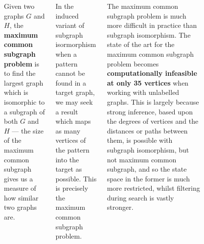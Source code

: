 \documentclass[a0paper]{tikzposter}
\begin{document}
\begin{columns}
{\begin{figure}
\begin{center}
\end{center}
\end{figure}

Given two graphs $G$ and $H$, the \textbf{maximum common subgraph problem} is to find the largest graph which is isomorphic to
a subgraph of both $G$ and $H$ --- the size of the maximum common subgraph gives us a measure of how similar two graphs are.

\bigskip

In the induced variant of subgraph isormorphism when a pattern cannot be found in a target graph, we may seek a result which maps as many vertices of the pattern into the target as possible.  This is precisely the maximum common subgraph problem.

\bigskip

The maximum common subgraph problem is much more difficult in practice than subgraph isomorphism.
The state of the art for the maximum common subgraph
problem becomes \textbf{computationally
infeasible at only 35 vertices} when working with
unlabelled graphs. This is largely because strong inference,
based upon the degrees of vertices and the
distances or paths between them, is possible with subgraph isomorphism,
but not maximum common subgraph, and so the
state space in the former is much more restricted, whilst filtering
during search is vastly stronger.}


\end{columns}
\end{document}
